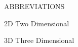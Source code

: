 \noindent
{\Large\sffamily ABBREVIATIONS}
    
\vspace{0.1in}

\begin{leftitemize}
\setlength\itemsep{5mm}
\item[2D] Two Dimensional
\item[3D] Three Dimensional
\end{leftitemize}